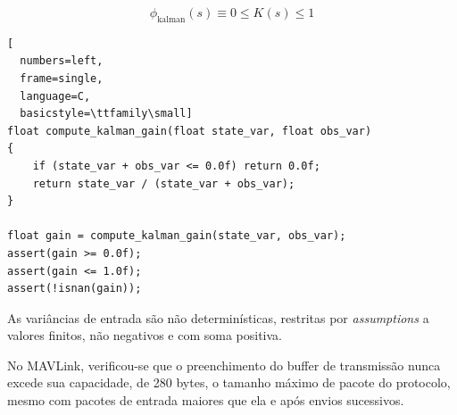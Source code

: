 
\begin{equation}
\phi_{\text{kalman}}(s) \equiv 0 \leq K(s) \leq 1
\label{eq:prop_kalman}
\end{equation}


\begin{lstlisting}[
  numbers=left,
  frame=single,
  language=C,
  basicstyle=\ttfamily\small]
float compute_kalman_gain(float state_var, float obs_var)
{
    if (state_var + obs_var <= 0.0f) return 0.0f;
    return state_var / (state_var + obs_var);
}

float gain = compute_kalman_gain(state_var, obs_var);
assert(gain >= 0.0f);
assert(gain <= 1.0f);
assert(!isnan(gain));
\end{lstlisting}

As variâncias de entrada são não determinísticas, restritas por
\textit{assumptions} a valores finitos, não negativos e com soma positiva.


No MAVLink, verificou-se que o preenchimento do buffer de transmissão
nunca excede sua capacidade, de 280 bytes, o tamanho máximo de pacote do
protocolo, mesmo com pacotes de entrada maiores que ela e após envios
sucessivos.

\subsection{}
\label{subsec:proveniencia}


